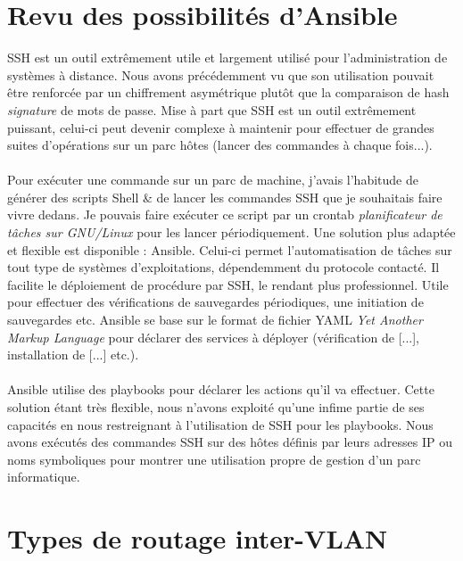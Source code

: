 \section{Revu des possibilités d'Ansible}

SSH est un outil extrêmement utile et largement utilisé pour l'administration de systèmes à distance. Nous avons précédemment vu que son utilisation pouvait être renforcée par un chiffrement asymétrique plutôt que la comparaison de hash \textit{signature} de mots de passe. Mise à part que SSH est un outil extrêmement puissant, celui-ci peut devenir complexe à maintenir pour effectuer de grandes suites d'opérations sur un parc hôtes (lancer des commandes à chaque fois...).
\\ \\
Pour exécuter une commande sur un parc de machine, j'avais l'habitude de générer des scripts Shell \& de lancer les commandes SSH que je souhaitais faire vivre dedans. Je pouvais faire exécuter ce script par un crontab \textit{planificateur de tâches sur GNU/Linux} pour les lancer périodiquement. Une solution plus adaptée et flexible est disponible : Ansible. Celui-ci permet l'automatisation de tâches sur tout type de systèmes d'exploitations, dépendemment du protocole contacté. Il facilite le déploiement de procédure par SSH, le rendant plus professionnel. Utile pour effectuer des vérifications de sauvegardes périodiques, une initiation de sauvegardes etc. Ansible se base sur le format de fichier YAML \textit{Yet Another Markup Language} pour déclarer des services à déployer (vérification de [...], installation de [...] etc.).
\\ \\
Ansible utilise des playbooks pour déclarer les actions qu'il va effectuer. Cette solution étant très flexible, nous n'avons exploité qu'une infime partie de ses capacités en nous restreignant à l'utilisation de SSH pour les playbooks. Nous avons exécutés des commandes SSH sur des hôtes définis par leurs adresses IP ou noms symboliques pour montrer une utilisation propre de gestion d'un parc informatique.

\section{Types de routage inter-VLAN}

